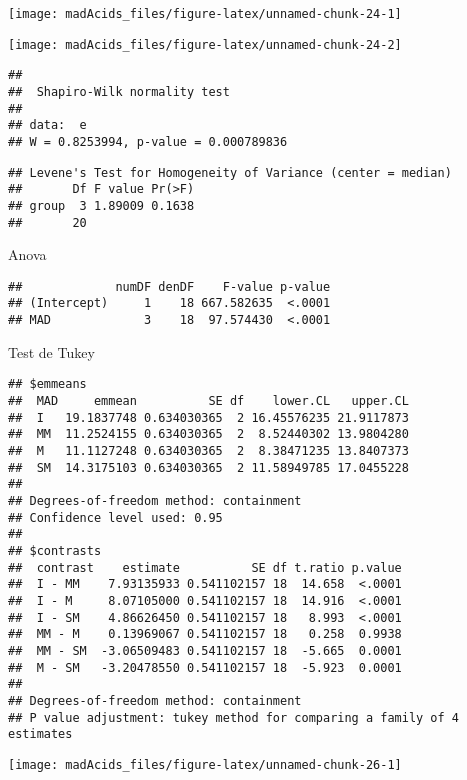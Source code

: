 \documentclass[
]{article}
\begin{document}
\begin{center}\texttt{[image: madAcids\_files/figure-latex/unnamed-chunk-24-1]} \end{center}

\begin{center}\texttt{[image: madAcids\_files/figure-latex/unnamed-chunk-24-2]} \end{center}

\begin{verbatim}
## 
##  Shapiro-Wilk normality test
## 
## data:  e
## W = 0.8253994, p-value = 0.000789836
\end{verbatim}

\begin{verbatim}
## Levene's Test for Homogeneity of Variance (center = median)
##       Df F value Pr(>F)
## group  3 1.89009 0.1638
##       20
\end{verbatim}

Anova

\begin{verbatim}
##             numDF denDF    F-value p-value
## (Intercept)     1    18 667.582635  <.0001
## MAD             3    18  97.574430  <.0001
\end{verbatim}

Test de Tukey

\begin{verbatim}
## $emmeans
##  MAD     emmean          SE df    lower.CL   upper.CL
##  I   19.1837748 0.634030365  2 16.45576235 21.9117873
##  MM  11.2524155 0.634030365  2  8.52440302 13.9804280
##  M   11.1127248 0.634030365  2  8.38471235 13.8407373
##  SM  14.3175103 0.634030365  2 11.58949785 17.0455228
## 
## Degrees-of-freedom method: containment 
## Confidence level used: 0.95 
## 
## $contrasts
##  contrast    estimate          SE df t.ratio p.value
##  I - MM    7.93135933 0.541102157 18  14.658  <.0001
##  I - M     8.07105000 0.541102157 18  14.916  <.0001
##  I - SM    4.86626450 0.541102157 18   8.993  <.0001
##  MM - M    0.13969067 0.541102157 18   0.258  0.9938
##  MM - SM  -3.06509483 0.541102157 18  -5.665  0.0001
##  M - SM   -3.20478550 0.541102157 18  -5.923  0.0001
## 
## Degrees-of-freedom method: containment 
## P value adjustment: tukey method for comparing a family of 4 estimates
\end{verbatim}

\begin{center}\texttt{[image: madAcids\_files/figure-latex/unnamed-chunk-26-1]} \end{center}
\end{document}
